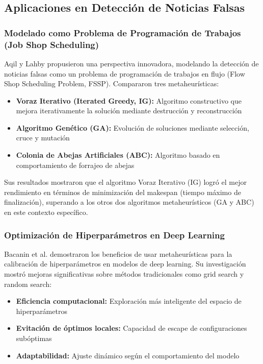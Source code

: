 \subsection{Aplicaciones en Detección de Noticias Falsas}

\subsubsection{Modelado como Problema de Programación de Trabajos (Job Shop Scheduling)}

Aqil y Lahby \cite{aqil2021modeling} propusieron una perspectiva innovadora, modelando la detección de noticias falsas como un problema de programación de trabajos en flujo (Flow Shop Scheduling Problem, FSSP). Compararon tres metaheurísticas:
\begin{itemize}
    \item \textbf{Voraz Iterativo (Iterated Greedy, IG):} Algoritmo constructivo que mejora iterativamente la solución mediante destrucción y reconstrucción
    \item \textbf{Algoritmo Genético (GA):} Evolución de soluciones mediante selección, cruce y mutación
    \item \textbf{Colonia de Abejas Artificiales (ABC):} Algoritmo basado en comportamiento de forrajeo de abejas
\end{itemize}

Sus resultados mostraron que el algoritmo Voraz Iterativo (IG) logró el mejor rendimiento en términos de minimización del makespan (tiempo máximo de finalización), superando a los otros dos algoritmos metaheurísticos (GA y ABC) en este contexto específico.

\subsubsection{Optimización de Hiperparámetros en Deep Learning}

Bacanin et al. \cite{bacanin2023benefits} demostraron los beneficios de usar metaheurísticas para la calibración de hiperparámetros en modelos de deep learning. Su investigación mostró mejoras significativas sobre métodos tradicionales como grid search y random search:

\begin{itemize}
    \item \textbf{Eficiencia computacional:} Exploración más inteligente del espacio de hiperparámetros
    \item \textbf{Evitación de óptimos locales:} Capacidad de escape de configuraciones subóptimas
    \item \textbf{Adaptabilidad:} Ajuste dinámico según el comportamiento del modelo
\end{itemize}


